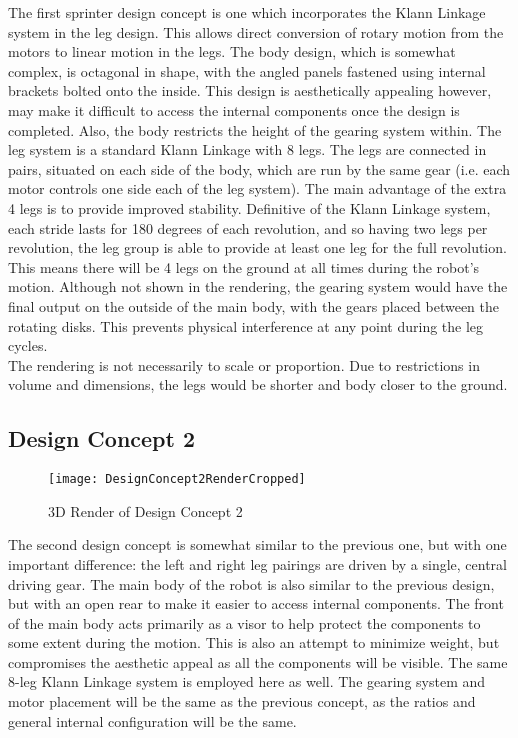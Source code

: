     The first sprinter design concept is one which incorporates the Klann Linkage system in the leg design. This allows direct conversion of rotary motion from the motors to linear motion in the legs. The body design, which is somewhat complex, is octagonal in shape, with the angled panels fastened using internal brackets bolted onto the inside. This design is aesthetically appealing however, may make it difficult to access the internal components once the design is completed.  Also, the body restricts the height of the gearing system within. The leg system is a standard Klann Linkage with 8 legs. The legs are connected in pairs, situated on each side of the body, which are run by the same gear (i.e. each motor controls one side each of the leg system).  The main advantage of the extra 4 legs is to provide improved stability. Definitive of the Klann Linkage system, each stride lasts for 180 degrees of each revolution, and so having two legs per revolution, the leg group is able to provide at least one leg for the full revolution. This means there will be 4 legs on the ground at all times during the robot's motion. Although not shown in the rendering, the gearing system would have the final output on the outside of the main body, with the gears placed between the rotating disks. This prevents physical interference at any point during the leg cycles.\\

    The rendering is not necessarily to scale or proportion.  Due to restrictions in volume and dimensions, the legs would be shorter and body closer to the ground.

  \subsection{Design Concept 2}
  \label{sub:Design Concept 2}
    \begin{figure}[H]
      \begin{center}
        \texttt{[image: DesignConcept2RenderCropped]}
        \caption{3D Render of Design Concept 2}
        \label{fig:3dConcept2}
      \end{center}
    \end{figure}

    The second design concept is somewhat similar to the previous one, but with one important difference: the left and right leg pairings are driven by a single, central driving gear. The main body of the robot is also similar to the previous design, but with an open rear to make it easier to access internal components. The front of the main body acts primarily as a visor to help protect the components to some extent during the motion. This is also an attempt to minimize weight, but compromises the aesthetic appeal as all the components will be visible. The same 8-leg Klann Linkage system is employed here as well. The gearing system and motor placement will be the same as the previous concept, as the ratios and general internal configuration will be the same.


